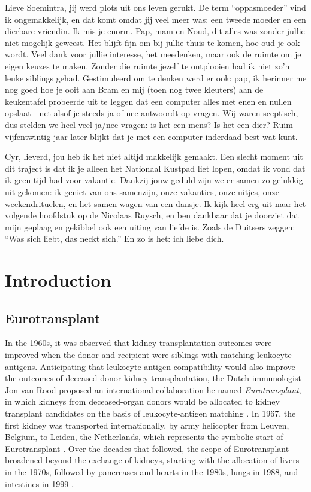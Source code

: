 \documentclass[11pt,twoside,]{book}
\begin{document}
Lieve Soemintra, jij werd plots uit ons leven gerukt. De term ``oppasmoeder'' vind
ik ongemakkelijk, en dat komt omdat jij veel meer was: een tweede
moeder en een dierbare vriendin. Ik mis je enorm. Pap, mam en Noud, dit
alles was zonder jullie niet mogelijk geweest. Het blijft fijn om bij jullie
thuis te komen, hoe oud je ook wordt. Veel dank voor jullie interesse, het
meedenken, maar ook de ruimte om je eigen keuzes te maken. Zonder die ruimte
jezelf te ontplooien had ik niet zo'n leuke siblings gehad. Gestimuleerd om te denken werd er ook: pap, ik herinner me nog goed hoe je ooit aan
Bram en mij (toen nog twee kleuters) aan de keukentafel probeerde uit te leggen
dat een computer
alles met enen en nullen opslaat - net alsof je steeds ja of nee antwoordt op vragen. Wij waren sceptisch, dus stelden we heel veel ja/nee-vragen: is het een
mens? Is het een dier? Ruim vijfentwintig jaar later blijkt dat je met een
computer inderdaad best wat kunt.

Cyr, lieverd, jou heb ik het niet altijd makkelijk gemaakt. Een slecht moment
uit dit traject is dat ik je alleen het Nationaal Kustpad liet lopen,
omdat ik vond dat ik geen tijd had voor vakantie. Dankzij jouw geduld zijn we er
samen zo gelukkig uit gekomen: ik geniet van ons samenzijn, onze vakanties, onze uitjes, onze weekendrituelen, en het samen wagen van een dansje. Ik kijk heel
erg uit naar het volgende hoofdstuk op de Nicolaas Ruysch, en ben dankbaar dat je
doorziet dat
mijn geplaag en gekibbel ook een uiting van liefde is. Zoals de Duitsers zeggen:
``Was sich liebt, das neckt sich.'' En zo is het: ich liebe dich.

\chapter{Introduction}\label{CHintroduction}

\vspace*{-1em}

\section{Eurotransplant}\label{eurotransplant}

In the 1960s, it was observed that kidney transplantation outcomes were
improved when the donor and recipient were siblings with matching leukocyte antigens.
Anticipating that leukocyte-antigen compatibility would also improve the outcomes
of deceased-donor kidney transplantation, the Dutch immunologist Jon van Rood
proposed an international collaboration he named \emph{Eurotransplant}, in which kidneys
from deceased-organ donors would be allocated to kidney transplant candidates on the basis of
leukocyte-antigen matching \citep{vanRoodET1967}. In 1967, the first kidney was
transported internationally, by army helicopter from Leuven, Belgium, to Leiden,
the Netherlands, which represents the symbolic start of Eurotransplant \citep{jubileumboek}.
Over the decades that followed, the scope of Eurotransplant broadened beyond the
exchange of kidneys, starting with the allocation of livers in the 1970s,
followed by pancreases and hearts in the 1980s, lungs in 1988,
and intestines in 1999 \citep{Langer2012}.
\end{document}
